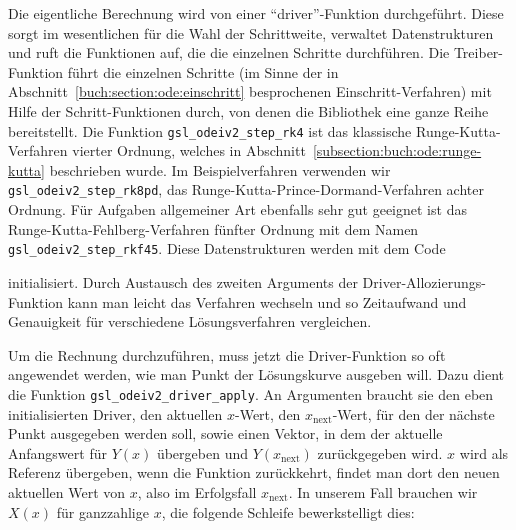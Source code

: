 Die eigentliche Berechnung wird von einer ``driver''-Funktion durchgeführt.
Diese sorgt im wesentlichen für die Wahl der Schrittweite, verwaltet
Datenstrukturen und ruft die Funktionen auf, die die einzelnen Schritte
durchführen.
Die Treiber-Funktion führt die einzelnen Schritte (im Sinne der
in Abschnitt~\ref{buch:section:ode:einschritt} besprochenen
Einschritt-Verfahren) mit
Hilfe der Schritt-Funktionen durch, von denen die Bibliothek eine
ganze Reihe bereitstellt.
Die Funktion \texttt{gsl\_odeiv2\_step\_rk4} ist das klassische
Runge-Kutta-Verfahren vierter Ordnung, welches in
Abschnitt~\ref{subsection:buch:ode:runge-kutta}
beschrieben wurde.
%
Im Beispielverfahren verwenden wir \texttt{gsl\_odeiv2\_step\_rk8pd},
das Runge-Kutta-Prince-Dormand-Verfahren achter Ordnung.
Für Aufgaben allgemeiner Art ebenfalls sehr gut geeignet ist das
Runge-Kutta-Fehlberg-Verfahren fünfter Ordnung mit dem Namen
\texttt{gsl\_odeiv2\_step\_rkf45}.
%
Diese Datenstrukturen werden mit dem Code

initialisiert.
Durch Austausch des zweiten Arguments der Driver-Allozierungs-Funktion
kann man leicht das Verfahren wechseln und so Zeitaufwand und Genauigkeit
für verschiedene Lösungsverfahren vergleichen.
%

Um die Rechnung durchzuführen, muss jetzt die Driver-Funktion so oft
angewendet werden, wie man Punkt der Lösungskurve ausgeben will.
Dazu dient die Funktion \texttt{gsl\_odeiv2\_driver\_apply}. 
An Argumenten braucht sie den eben initialisierten Driver, den aktuellen
$x$-Wert, den $x_{\text{next}}$-Wert, für den der nächste Punkt
ausgegeben werden soll, sowie einen Vektor, in dem der aktuelle Anfangswert
für $Y(x)$ übergeben und $Y(x_{\text{next}})$ zurückgegeben wird.
$x$ wird als Referenz übergeben, wenn die Funktion zurückkehrt,
findet man dort den neuen aktuellen Wert von $x$, also im Erfolgsfall
$x_{\text{next}}$.
In unserem Fall brauchen wir $X(x)$ für ganzzahlige $x$, die folgende
Schleife bewerkstelligt dies:


